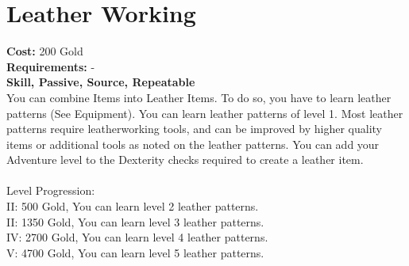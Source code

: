 \section*{Leather Working}
\textbf{Cost:} 200 Gold\\
\textbf{Requirements:} -\\
\textbf{Skill, Passive, Source, Repeatable}\\
You can combine Items into Leather Items. To do so, you have to learn leather patterns (See Equipment). You can learn leather patterns of level 1. Most leather patterns require leatherworking tools, and can be improved by higher quality items or additional tools as noted on the leather patterns. You can add your Adventure level to the Dexterity checks required to create a leather item.\\
\\
Level Progression:\\
II: 500 Gold, You can learn level 2 leather patterns.\\
II: 1350 Gold, You can learn level 3 leather patterns.\\
IV: 2700 Gold, You can learn level 4 leather patterns.\\
V: 4700 Gold, You can learn level 5 leather patterns.\\